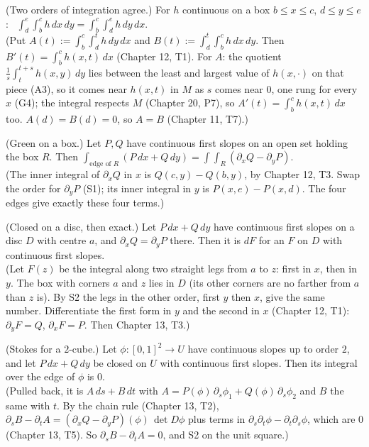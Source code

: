 \begin{lines}
\item[\lab{S1}] (Two orders of integration agree.) For $h$ continuous on a box $b \le x \le c$, $d \le y \le e$: \ $\int_d^e \int_b^c h \, dx \, dy = \int_b^c \int_d^e h \, dy \, dx$. \\
(Put $A(t) := \int_b^c \int_d^t h \, dy\, dx$ and $B(t) := \int_d^t \int_b^c h \, dx\, dy$. Then $B'(t) = \int_b^c h(x, t)\, dx$ (Chapter 12, T1). For $A$: the quotient $\frac1s \int_t^{t+s} h(x, y)\,dy$ lies between the least and largest value of $h(x, \cdot)$ on that piece (A3), so it comes near $h(x, t)$ in $M$ as $s$ comes near $0$, one rung for every $x$ (G4); the integral respects $M$ (Chapter 20, P7), so $A'(t) = \int_b^c h(x, t)\, dx$ too. $A(d) = B(d) = 0$, so $A = B$ (Chapter 11, T7).)
\item[\lab{S2}] (Green on a box.) Let $P, Q$ have continuous first slopes on an open set holding the box $R$. Then $\int_{\text{edge of } R} (P\,dx + Q\,dy) = \int\!\!\int_R (\partial_x Q - \partial_y P)$. \\
(The inner integral of $\partial_x Q$ in $x$ is $Q(c, y) - Q(b, y)$, by Chapter 12, T3. Swap the order for $\partial_y P$ (S1); its inner integral in $y$ is $P(x, e) - P(x, d)$. The four edges give exactly these four terms.)
\item[\lab{S3}] (Closed on a disc, then exact.) Let $P\,dx + Q\,dy$ have continuous first slopes on a disc $D$ with centre $a$, and $\partial_x Q = \partial_y P$ there. Then it is $dF$ for an $F$ on $D$ with continuous first slopes. \\
(Let $F(z)$ be the integral along two straight legs from $a$ to $z$: first in $x$, then in $y$. The box with corners $a$ and $z$ lies in $D$ (its other corners are no farther from $a$ than $z$ is). By S2 the legs in the other order, first $y$ then $x$, give the same number. Differentiate the first form in $y$ and the second in $x$ (Chapter 12, T1): $\partial_y F = Q$, $\partial_x F = P$. Then Chapter 13, T3.)
\item[\lab{S4}] (Stokes for a $2$-cube.) Let $\phi : [0,1]^2 \to U$ have continuous slopes up to order $2$, and let $P\,dx + Q\,dy$ be closed on $U$ with continuous first slopes. Then its integral over the edge of $\phi$ is $0$. \\
(Pulled back, it is $A\,ds + B\,dt$ with $A = P(\phi)\,\partial_s \phi_1 + Q(\phi)\,\partial_s \phi_2$ and $B$ the same with $t$. By the chain rule (Chapter 13, T2), $\partial_s B - \partial_t A = (\partial_x Q - \partial_y P)(\phi)\,\det D\phi$ plus terms in $\partial_s \partial_t \phi - \partial_t \partial_s \phi$, which are $0$ (Chapter 13, T5). So $\partial_s B - \partial_t A = 0$, and S2 on the unit square.)
\end{lines}

